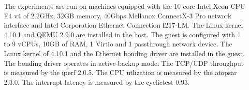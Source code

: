 The experiments are run on machines equipped with the 10-core
Intel Xeon CPU E4 v4 of 2.2GHz, 32GB memory, 40Gbps Mellanox
ConnectX-3 Pro network interface and Intel Corporation
Ethernet Connection I217-LM. The Linux kernel 4.10.1 and QEMU
2.9.0 are installed in the host. The guest is configured with
1 to 9 vCPUs, 10GB of RAM, 1 Virtio and 1 passthrough network
device. The Linux kernel of 4.10.1 and the Ethernet bonding
driver are installed in the guest. The bonding driver operates
in active-backup mode. The TCP/UDP throughput is measured by
the iperf 2.0.5. The CPU utlization is measured by the atopsar
2.3.0. The interrupt latency is measured by the cyclictest
0.93.
